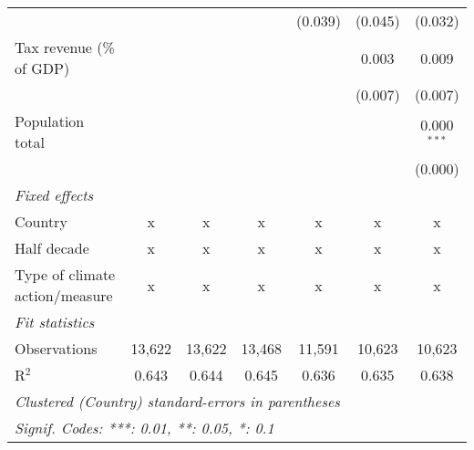 \begin{tabular}{lcccccc}
                                            &               &                &                & (0.039)        & (0.045)        & (0.032)\\   
   Tax revenue (\% of GDP)                  &               &                &                &                & 0.003          & 0.009\\   
                                            &               &                &                &                & (0.007)        & (0.007)\\   
   Population total                         &               &                &                &                &                & 0.000$^{***}$\\   
                                            &               &                &                &                &                & (0.000)\\   
   \emph{Fixed effects}\\
   Country                                  & x             & x              & x              & x              & x              & x\\  
   Half decade                              & x             & x              & x              & x              & x              & x\\  
   Type of climate action/measure           & x             & x              & x              & x              & x              & x\\  
   \midrule \emph{Fit statistics}\\
   Observations                             & 13,622        & 13,622         & 13,468         & 11,591         & 10,623         & 10,623\\  
   R$^2$                                    & 0.643         & 0.644          & 0.645          & 0.636          & 0.635          & 0.638\\  
   \midrule
   \multicolumn{7}{l}{\emph{Clustered (Country) standard-errors in parentheses}}\\
   \multicolumn{7}{l}{\emph{Signif. Codes: ***: 0.01, **: 0.05, *: 0.1}}\\
\end{tabular}
\par\endgroup


